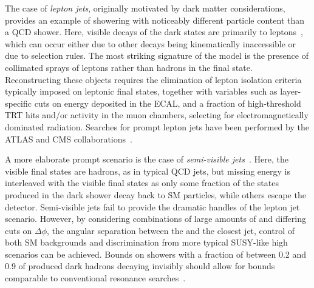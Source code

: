 The case of \emph{lepton jets}, originally motivated by dark matter considerations, provides an example of showering with noticeably different particle content than a QCD shower. Here, visible decays of the dark states are primarily to leptons~\cite{Falkowski:2010cm,Falkowski:2010gv}, which can occur either due to other decays being kinematically inaccessible or due to selection rules. The most striking signature of the model is the presence of collimated sprays of leptons rather than hadrons in the final state. Reconstructing these objects requires the elimination of lepton isolation criteria typically imposed on leptonic final states, together with variables such as layer-specific cuts on energy deposited in the ECAL, and a fraction of high-threshold TRT hits and/or activity in the muon chambers, selecting for electromagnetically dominated radiation. Searches for prompt lepton jets have been performed by the ATLAS and CMS collaborations~\cite{Chatrchyan:2011hr,Aad:2015sms}.

A more elaborate prompt scenario is the case of \emph{semi-visible jets}~\cite{Cohen:2015toa}. Here, the visible final states are hadrons, as in typical QCD jets, but missing energy is interleaved with the visible final states as only some fraction of the states produced in the dark shower decay back to SM particles, while others escape the detector. Semi-visible jets fail to provide the dramatic handles of the lepton jet scenario. However, by considering combinations of large amounts of \MET and differing cuts on $\Delta\phi$, the angular separation between the \MET and the closest jet, control of both SM backgrounds and discrimination from more typical SUSY-like high \MET scenarios can be achieved. Bounds on showers with a fraction of between 0.2 and 0.9 of produced dark hadrons decaying invisibly should allow for bounds comparable to conventional resonance searches~\cite{Cohen:2017pzm}.

